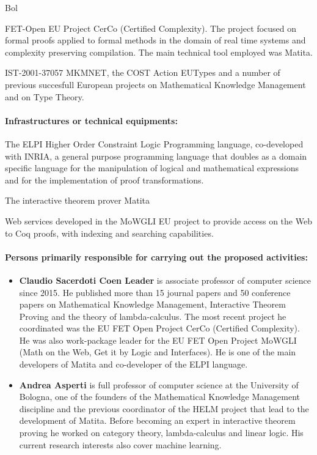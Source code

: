 \begin{sitedescription}{Bol}
\begin{compactitem}
\item FET-Open EU Project CerCo (Certified Complexity). The project focused on formal proofs applied to formal methods in the domain of real time systems and complexity preserving compilation. The main technical tool employed was Matita.

\item IST-2001-37057 MKMNET, the COST Action EUTypes and a number of previous succesfull European projects on Mathematical Knowledge Management and on Type Theory.
\end{compactitem}

\paragraph{Infrastructures or technical equipments:}

\begin{compactitem}
\item The ELPI Higher Order Constraint Logic Programming language, co-developed with INRIA, a general purpose programming language that doubles as a domain specific language for the manipulation of logical and mathematical expressions and for the implementation of proof transformations.
\item The interactive theorem prover Matita
\item Web services developed in the MoWGLI EU project to provide access on the Web to Coq proofs, with indexing and searching capabilities.
\end{compactitem}

\paragraph{Persons primarily responsible for carrying out the proposed activities:}

\begin{itemize}
\item \textbf{Claudio Sacerdoti Coen Leader} is associate professor of computer science since 2015. He published more than 15 journal papers and 50 conference papers on Mathematical Knowledge Management, Interactive Theorem Proving and the theory of lambda-calculus. The most recent project he coordinated was the EU FET Open Project CerCo (Certified Complexity). He was also work-package leader for the EU FET Open Project MoWGLI (Math on the Web, Get it by Logic and Interfaces). He is one of the main developers of Matita and co-developer of the ELPI language.

\item \textbf{Andrea Asperti} is full professor of computer science at the University of Bologna, one of the founders of the Mathematical Knowledge Management discipline and the previous coordinator of the HELM project that lead to the development of Matita. Before becoming an expert in interactive theorem proving he worked on category theory, lambda-calculus and linear logic. His current research interests also cover machine learning.
\end{itemize}

\end{sitedescription}
